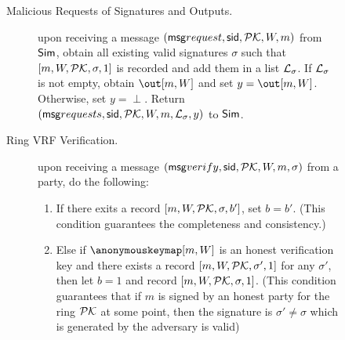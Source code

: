 \begin{figure}
\begin{tcolorbox}
{\begin{description}
			\item [Malicious Requests of  Signatures and Outputs.] upon receiving a message $ (\mathsf{msg}{request}, \textsf{sid}, {\mathcal{PK}}, W, m) $ from $ \mathsf{Sim} $, obtain all existing valid signatures $ \sigma $ such that $ [m,W,{\mathcal{PK}},\sigma, 1] $ is recorded and add them in a list $ {\mathcal{L}}_{\sigma} $. If $ {\mathcal{L}}_{\sigma}  $ is not empty, obtain $ \out[m,W] $ and set $ y = \out[m,W]  $. Otherwise, set $ y = \perp $. Return $ (\mathsf{msg}{requests}, \textsf{sid}, {\mathcal{PK}}, W,m, {\mathcal{L}}_{\sigma},y)  $ to $ \mathsf{Sim} $.
			\item[Ring VRF Verification.] upon receiving a message $(\mathsf{msg}{verify}, \textsf{sid}, {\mathcal{PK}},W, m, \sigma)$ from a party, do the following: 
			\begin{enumerate}[label={{Cond.-} }{{\arabic*}}, start = 1]
				\item If there exits a record $ [m,W,{\mathcal{PK}},\sigma, b'] $, set $ b = b' $. (This condition guarantees the completeness and consistency.)
				
				\label{cond:consistency}
				\item Else if $ \anonymouskeymap[m,W]  $ is an honest verification key and  there exists a record $ [m, W,{\mathcal{PK}}, \sigma', 1] $ for any $ \sigma' $, then let $ b=1 $ and record $ [m, W,{\mathcal{PK}},\sigma, 1] $. (This condition guarantees that if $ m $ is signed by an honest party for the ring $ {\mathcal{PK}} $ at some point, then the signature is $ \sigma' \neq \sigma $ which is generated by the adversary is valid) \label{cond:differentsignature}
				

\end{enumerate}
\end{description}}
\end{tcolorbox}
\end{figure}
